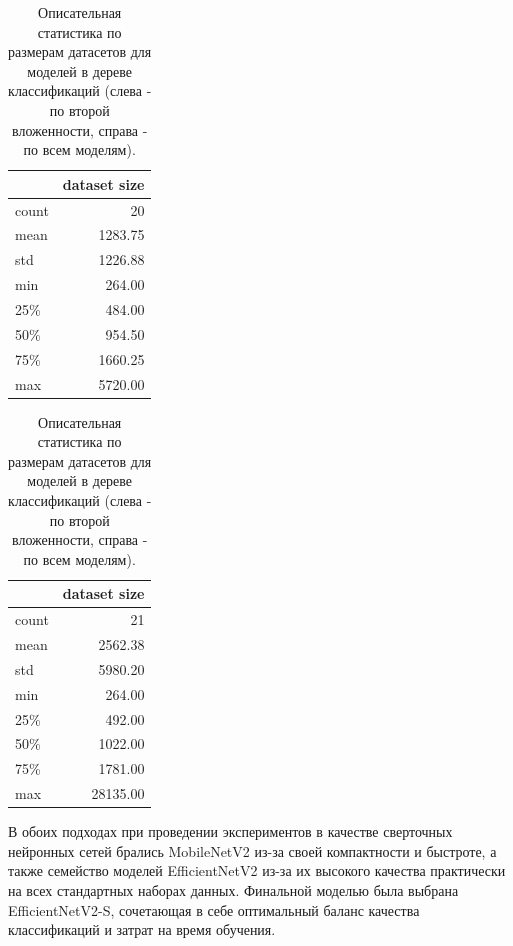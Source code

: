 \documentclass[a4paper,12pt]{extarticle}
\begin{document}
\begin{table}[ht]
	\caption{Описательная статистика по размерам датасетов для моделей в дереве классификаций (слева - по второй вложенности, справа - по всем моделям).} 
	\label{table:modelstatistic1}
	\footnotesize
	\centering
	\begin{tabular}{l|r}
		\toprule
		{} & \multicolumn{1}{c}{dataset size}\\
		\midrule
		count &	20\\
		mean  & 1283.75\\
		std   & 1226.88\\
		min   &	264.00\\
		25\%  &	484.00\\
		50\%  &	954.50\\
		75\%  &	1660.25\\
		max   &	5720.00\\
		\bottomrule
	\end{tabular}
	\hspace{2cm}
	\begin{tabular}{l|r}
		\toprule
		{} & \multicolumn{1}{c}{dataset size}\\
		\midrule
		count &	21\\
		mean  & 2562.38\\
		std   & 5980.20\\
		min   &	264.00\\
		25\%  &	492.00\\
		50\%  &	1022.00\\
		75\%  &	1781.00\\
		max   &	28135.00\\
		\bottomrule
	\end{tabular}
\end{table}

В обоих подходах при проведении экспериментов в качестве сверточных нейронных сетей брались MobileNetV2 из-за своей компактности и быстроте, а также семейство моделей EfficientNetV2 из-за их высокого качества практически на всех стандартных наборах данных. Финальной моделью была выбрана EfficientNetV2-S, сочетающая в себе оптимальный баланс качества классификаций и затрат на время обучения.
\end{document}
